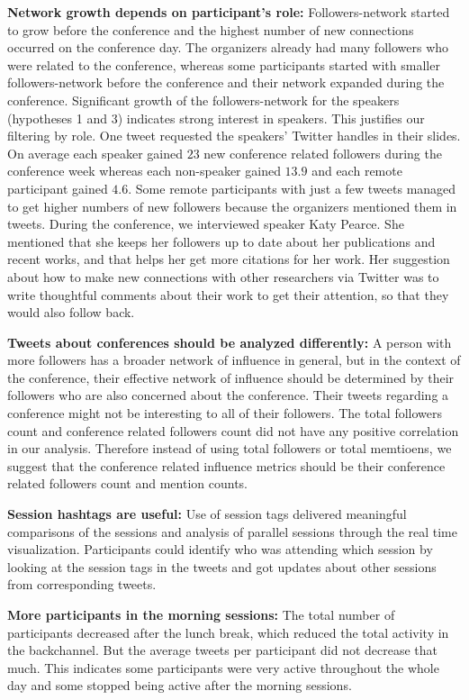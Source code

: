 \documentclass[conference,final]{IEEEtran}
\begin{document}
\textbf{Network growth depends on participant's role:} Followers-network started to grow before the conference and the highest number of new connections occurred on the conference day. The organizers already had many followers who were related to the conference, whereas some participants started with smaller followers-network before the conference and their network expanded during the conference. Significant growth of the followers-network for the speakers (hypotheses 1 and 3) indicates strong interest in speakers. This justifies our filtering by role. One tweet requested the speakers' Twitter handles in their slides. On average each speaker gained $23$ new conference related followers during the conference week whereas each non-speaker gained $13.9$ and each remote participant gained $4.6$. Some remote participants with just a few tweets managed to get higher numbers of new followers because the organizers mentioned them in tweets.
During the conference, we interviewed speaker Katy Pearce. She mentioned that she keeps her followers up to date about her publications and recent works, and that helps her get more citations for her work. Her suggestion about how to make new connections with other researchers via Twitter was to write thoughtful comments about their work to get their attention, so that they would also follow back.

\textbf{Tweets about conferences should be analyzed differently:} A person with more followers has a broader network of influence in general, but in the context of the conference, their effective network of influence should be determined by their followers who are also concerned about the conference. Their tweets regarding a conference might not be interesting to all of their followers. The total followers count and conference related followers count did not have any positive correlation in our analysis. Therefore instead of using total followers or total memtioens, we suggest that the conference related influence metrics should be their conference related followers count and mention counts. 

\textbf{Session hashtags are useful:} Use of session tags delivered meaningful comparisons of the sessions and analysis of parallel sessions through the real time visualization. Participants could identify who was attending which session by looking at the session tags in the tweets and got updates about other sessions from corresponding tweets. 

\textbf{More participants in the morning sessions:} The total number of participants decreased after the lunch break, which reduced the total activity in the backchannel. But the average tweets per participant did not decrease that much. This indicates some participants were very active throughout the whole day and some stopped being active after the morning sessions.
\end{document}
